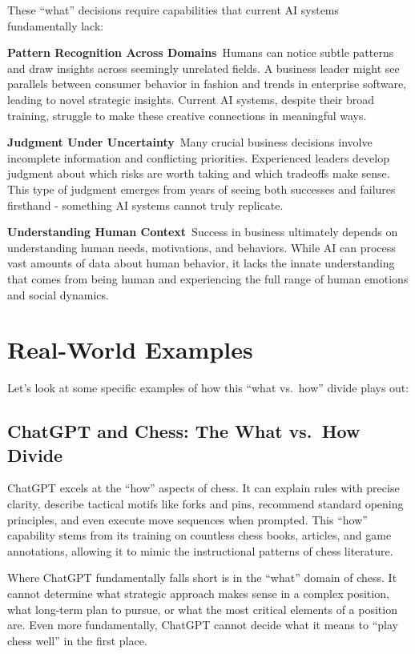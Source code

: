 \documentclass[
  Letterpaper,
]{scrbook}
\begin{document}
These ``what'' decisions require capabilities that current AI systems
fundamentally lack:

\textbf{Pattern Recognition Across Domains}~Humans can notice subtle
patterns and draw insights across seemingly unrelated fields. A business
leader might see parallels between consumer behavior in fashion and
trends in enterprise software, leading to novel strategic insights.
Current AI systems, despite their broad training, struggle to make these
creative connections in meaningful ways.

\textbf{Judgment Under Uncertainty}~Many crucial business decisions
involve incomplete information and conflicting priorities. Experienced
leaders develop judgment about which risks are worth taking and which
tradeoffs make sense. This type of judgment emerges from years of seeing
both successes and failures firsthand - something AI systems cannot
truly replicate.

\textbf{Understanding Human Context}~Success in business ultimately
depends on understanding human needs, motivations, and behaviors. While
AI can process vast amounts of data about human behavior, it lacks the
innate understanding that comes from being human and experiencing the
full range of human emotions and social dynamics.

\section{Real-World Examples}\label{real-world-examples}

Let's look at some specific examples of how this ``what vs.~how'' divide
plays out:

\subsection{ChatGPT and Chess: The What vs.~How
Divide}\label{chatgpt-and-chess-the-what-vs.-how-divide}

ChatGPT excels at the ``how'' aspects of chess. It can explain rules
with precise clarity, describe tactical motifs like forks and pins,
recommend standard opening principles, and even execute move sequences
when prompted. This ``how'' capability stems from its training on
countless chess books, articles, and game annotations, allowing it to
mimic the instructional patterns of chess literature.

Where ChatGPT fundamentally falls short is in the ``what'' domain of
chess. It cannot determine what strategic approach makes sense in a
complex position, what long-term plan to pursue, or what the most
critical elements of a position are. Even more fundamentally, ChatGPT
cannot decide what it means to ``play chess well'' in the first place.
\end{document}
